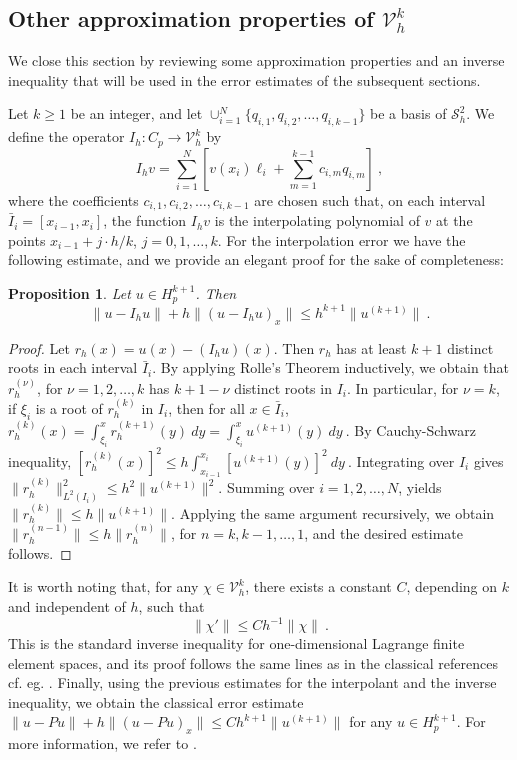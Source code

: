 \documentclass{amsart}
\newtheorem{proposition}{Proposition}[section]
\begin{document}
\subsection{Other approximation properties of $\mathcal{V}_h^k$}

We close this section by reviewing some approximation properties and an inverse inequality that will be used in the error estimates of the subsequent sections.

Let $k\geq 1$ be an integer, and let $\cup_{i=1}^{N}\{q_{i,1},q_{i,2},\dots, q_{i,k-1}\}$ be a basis of $\mathcal{S}_h^2$. We define the operator $I_h:C_p\to \mathcal{V}_h^k$ by 
$$I_hv=\sum_{i=1}^N\left[v(x_i)\ell_i+\sum_{m=1}^{k-1} c_{i,m} q_{i,m} \right]\ ,$$
where the coefficients $c_{i,1},c_{i,2},\dots,c_{i,k-1}$ are chosen such that, on each interval $\bar{I}_i=[x_{i-1},x_i]$, the function $I_h v$ is the interpolating polynomial of $v$ at the points $x_{i-1}+j\cdot h/k$, $j=0,1,\dots,k$. For the interpolation error we have the following estimate, and we provide an elegant proof for the sake of completeness:
%
\begin{proposition}
Let $u\in H_p^{k+1}$. Then
\begin{equation}\label{eq:appropro}
    \|u-I_h u\|+h\|(u-I_hu)_x\|\leq h^{k+1}\|u^{(k+1)}\|\ .
\end{equation}
\end{proposition}
\begin{proof}
Let $r_h(x)=u(x)-(I_hu)(x)$. Then $r_h$ has at least $k+1$ distinct roots in each interval $\bar{I}_i$. By applying Rolle's Theorem inductively, we obtain that $r_h^{(\nu)}$, for $\nu=1,2,\dots,k$ has $k+1-\nu$ distinct roots in $I_i$. In particular, for $\nu=k$, if $\xi_i$ is a root of $r_h^{(k)}$ in $I_i$, then for all $x\in\bar{I}_i$,
 $r_h^{(k)}(x)=\int_{\xi_i}^x r_h^{(k+1)}(y)~dy=\int_{\xi_i}^x u^{(k+1)}(y)~dy\ .$
By Cauchy-Schwarz inequality,
$[r_h^{(k)}(x)]^2\leq h\int_{x_{i-1}}^{x_i}[u^{(k+1)}(y)]^2~dy\ .$ 
Integrating over $I_i$ gives $\|r_h^{(k)}\|^2_{L^2(I_i)}\leq h^2\|u^{(k+1)}\|^2$.
Summing over $i=1,2,\dots, N$, yields $\|r_h^{(k)}\|\leq h\|u^{(k+1)}\|$.
Applying the same argument recursively, we obtain $\|r_h^{(n-1)}\|\leq h\|r_h^{(n)}\|$, for $n=k,k-1,\dots,1$, and the desired estimate follows.
\end{proof}
%
It is worth noting that, for any $\chi\in\mathcal{V}_h^k$, there exists a constant $C$, depending on $k$ and independent of $h$, such that 
%
\begin{equation}\label{eq:inverse}
\|\chi'\|\leq Ch^{-1}\|\chi\|\ .
\end{equation}
%
This is the standard inverse inequality for one-dimensional Lagrange finite element spaces, and its proof follows the same lines as in the classical references cf. eg. \cite{EG2004}.
%
Finally, using the previous estimates for the interpolant and the inverse inequality, we obtain the classical error estimate $\|u-Pu\|+h\|(u-Pu)_x\|\leq C h^{k+1}\|u^{(k+1)}\|$ for any $u\in H_p^{k+1}$. For more information, we refer to \cite{EG2004}.
\end{document}
